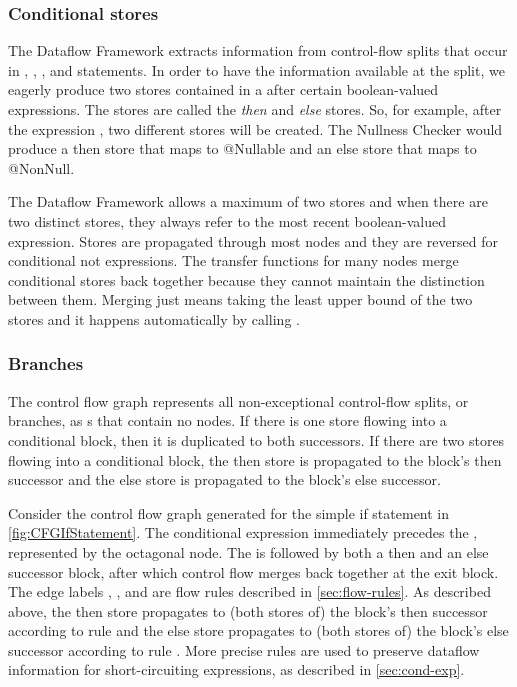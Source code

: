 \subsubsection{Conditional stores}
\label{sec:cond-stores}

The Dataflow Framework extracts information from control-flow splits
that occur in , , , and  statements.  In order to have
the information available at the split, we eagerly produce two stores
contained in a  after certain
boolean-valued expressions.  The stores are called the \emph{then} and
\emph{else} stores.  So, for example, after the expression , two different stores will be created.  The Nullness Checker
would produce a then store that maps  to @Nullable and an else
store that maps  to @NonNull.

The Dataflow Framework allows a maximum of two stores and when there
are two distinct stores, they always refer to the most recent
boolean-valued expression.  Stores are propagated through most nodes
and they are reversed for conditional not expressions.  The transfer
functions for many nodes merge conditional stores back together
because they cannot maintain the distinction between them.  Merging
just means taking the least upper bound of the two stores and it
happens automatically by calling .


\subsubsection{Branches}

The control flow graph represents all non-exceptional control-flow
splits, or branches, as s that contain no
nodes.  If there is one store flowing into a conditional block, then
it is duplicated to both successors.  If there are two stores flowing
into a conditional block, the then store is propagated to the block's
then successor and the else store is propagated to the block's else
successor.

Consider the control flow graph generated for the simple if statement
in \autoref{fig:CFGIfStatement}.  The conditional expression 
immediately precedes the , represented by the
octagonal node.  The  is followed by both a
then and an else successor block, after which control flow merges back
together at the exit block.  The edge labels ,
, and  are flow rules described
in \autoref{sec:flow-rules}.  As described above, the then store
propagates to (both stores of) the block's then successor according to
rule  and the else store propagates to (both stores
of) the block's else successor according to rule .
More precise rules are used to preserve dataflow information for
short-circuiting expressions, as described in \autoref{sec:cond-exp}.

